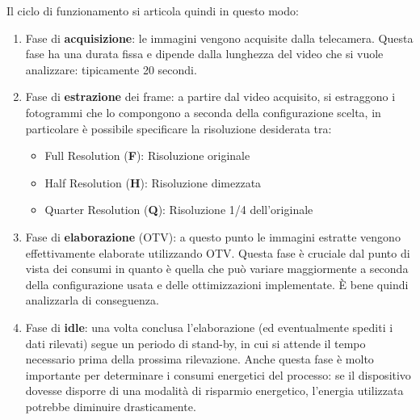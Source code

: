 Il ciclo di funzionamento si articola quindi in questo modo:
\begin{enumerate}
    \item Fase di \textbf{acquisizione}: le immagini vengono acquisite dalla telecamera. Questa fase ha una durata fissa e dipende
    dalla lunghezza del video che si vuole analizzare: tipicamente 20 secondi.
    \item Fase di \textbf{estrazione} dei frame: a partire dal video acquisito, si estraggono i fotogrammi che lo compongono a seconda
    della configurazione scelta, in particolare è possibile specificare la risoluzione desiderata tra:
    \begin{itemize}
        \item Full Resolution (\textbf{F}): Risoluzione originale
        \item Half Resolution (\textbf{H}): Risoluzione dimezzata
        \item Quarter Resolution (\textbf{Q}): Risoluzione 1/4 dell'originale
    \end{itemize}
    \item Fase di \textbf{elaborazione} (OTV): a questo punto le immagini estratte vengono effettivamente elaborate utilizzando
    OTV. Questa fase è cruciale dal punto di vista dei consumi in quanto è quella che può variare maggiormente a seconda della
    configurazione usata e delle ottimizzazioni implementate. È bene quindi analizzarla di conseguenza.
    \item Fase di \textbf{idle}: una volta conclusa l'elaborazione (ed eventualmente spediti i dati rilevati) segue un periodo di stand-by,
    in cui si attende il tempo necessario prima della prossima rilevazione. Anche questa fase è molto importante per determinare
    i consumi energetici del processo: se il dispositivo dovesse disporre di una modalità di risparmio energetico, 
    l'energia utilizzata potrebbe diminuire drasticamente.
\end{enumerate}


\clearpage{\pagestyle{empty}\cleardoublepage}